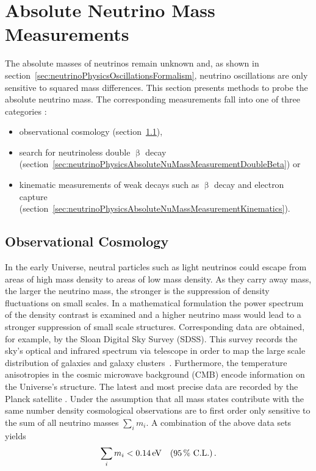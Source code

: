 \section{Absolute Neutrino Mass Measurements}
\label{sec:neutrinoPhysicsAbsoluteNuMassMeasurement}
The absolute masses of neutrinos remain unknown and, as shown in section~\ref{sec:neutrinoPhysicsOscillationsFormalism}, neutrino oscillations are only sensitive to squared mass differences. This section presents methods to probe the absolute neutrino mass. The corresponding measurements fall into one of three categories \cite{Otten:2008zz}:
\begin{itemize}
    \renewcommand{\labelitemi}{$\bullet$}
    \item observational cosmology (section~\ref{sec:neutrinoPhysicsAbsoluteNuMassMeasurementCosmo}),
    \item search for neutrinoless double $\upbeta$ decay (section~\ref{sec:neutrinoPhysicsAbsoluteNuMassMeasurementDoubleBeta}) or
    \item kinematic measurements of weak decays such as $\upbeta$ decay and electron capture (section~\ref{sec:neutrinoPhysicsAbsoluteNuMassMeasurementKinematics}).
\end{itemize}

\subsection{Observational Cosmology}
\label{sec:neutrinoPhysicsAbsoluteNuMassMeasurementCosmo}
In the early Universe, neutral particles such as light neutrinos could escape from areas of high mass density to areas of low mass density. As they carry away mass, the larger the neutrino mass, the stronger is the suppression of density fluctuations on small scales. In a mathematical formulation the power spectrum of the density contrast is examined and a higher neutrino mass would lead to a stronger suppression of small scale structures. Corresponding data are obtained, for example, by the Sloan Digital Sky Survey (SDSS). This survey records the sky's optical and infrared spectrum via telescope in order to map the large scale distribution of galaxies and galaxy clusters~\cite{Doroshkevich2004}. Furthermore, the temperature anisotropies in the cosmic microwave background (CMB) encode information on the Universe's structure. The latest and most precise data are recorded by the Planck satellite \cite{Aghanim:2018}. Under the assumption that all mass states contribute with the same number density cosmological observations are to first order only sensitive to the sum of all neutrino masses $\sum_{i} m_i$. A combination of the above data sets yields \cite{Yeche:2017upn}
\begin{equation*}
    \sum_i m_i < \SI{0.14}{eV} \quad (\SI{95}{\percent} \text{ C.L.}) \text{\,.}
\end{equation*}
\FloatBarrier

